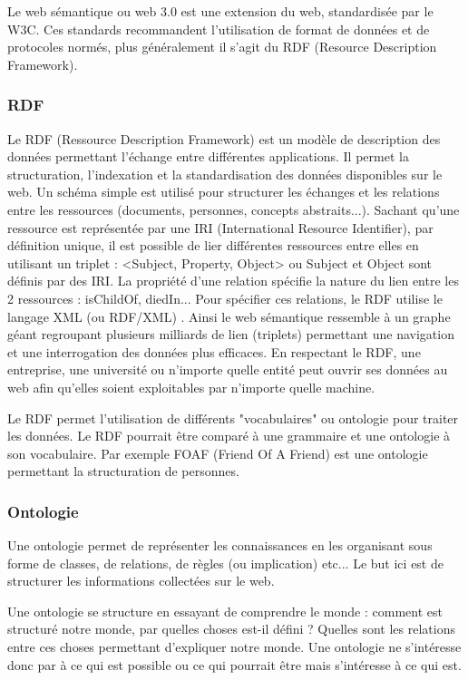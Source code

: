 \documentclass[french]{article}
\begin{document}
{Le web sémantique ou web 3.0 est une extension du web, standardisée par le W3C. Ces standards recommandent l'utilisation de format de données et de protocoles normés, plus généralement il s'agit du RDF (Resource Description Framework).

\subsubsection{RDF}

Le RDF (Ressource Description Framework) est un modèle de description des données permettant l'échange entre différentes applications. Il permet la structuration, l'indexation et la standardisation des données disponibles sur le web. Un schéma simple est utilisé pour structurer les échanges et les relations entre les ressources (documents, personnes, concepts abstraits...). Sachant qu'une ressource est représentée par une IRI (International Resource Identifier), par définition unique, il est possible de lier différentes ressources entre elles en utilisant un triplet : <Subject, Property, Object> ou Subject et Object sont définis par des IRI. La propriété d'une relation spécifie la nature du lien entre les 2 ressources : isChildOf, diedIn... Pour spécifier ces relations, le RDF utilise le langage XML (ou RDF/XML) \cite{rdf}.
\newline{}
Ainsi le web sémantique ressemble à un graphe géant regroupant plusieurs milliards de lien (triplets) permettant une navigation et une interrogation des données plus efficaces. En respectant le RDF, une entreprise, une université ou n'importe quelle entité peut ouvrir ses données au web afin qu'elles soient exploitables par n'importe quelle machine.

Le RDF permet l'utilisation de différents "vocabulaires" ou ontologie pour traiter les données. Le RDF pourrait être comparé à une grammaire et une ontologie à son vocabulaire. Par exemple FOAF (Friend Of A Friend) est une ontologie permettant la structuration de personnes. \cite{foaf}

\subsubsection{Ontologie}

Une ontologie permet de représenter les connaissances en les organisant sous forme de classes, de relations, de règles (ou implication) etc... Le but ici est de structurer les informations collectées sur le web.

Une ontologie se structure en essayant de comprendre le monde : comment est structuré notre monde, par quelles choses est-il défini ? Quelles sont les relations entre ces choses permettant d'expliquer notre monde. Une ontologie ne s'intéresse donc par à ce qui est possible ou ce qui pourrait être mais s'intéresse à ce qui est. \cite{shirky}

}
\end{document}
